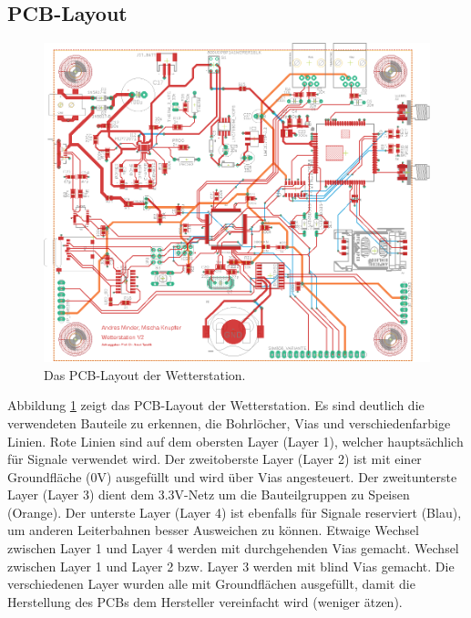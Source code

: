\begin{appendix}
\section{PCB-Layout}
\label{Anhang:PCB}
\begin{figure}[h]
\centering
\includegraphics[width=0.99\linewidth]{graphics/Anhang_Eagle/PCB.png}
\caption{Das PCB-Layout der Wetterstation.}
\label{fig:Anhang_PCBLayout}
\end{figure}
Abbildung \ref{fig:Anhang_PCBLayout} zeigt das PCB-Layout der Wetterstation. Es sind deutlich die verwendeten Bauteile zu erkennen, die Bohrlöcher, Vias und verschiedenfarbige Linien. Rote Linien sind auf dem obersten Layer (Layer 1), welcher hauptsächlich für Signale verwendet wird. Der zweitoberste Layer (Layer 2) ist mit einer Groundfläche (0V) ausgefüllt und wird über Vias angesteuert. Der zweitunterste Layer (Layer 3) dient dem 3.3V-Netz um die Bauteilgruppen zu Speisen (Orange). Der unterste Layer (Layer 4) ist ebenfalls für Signale reserviert (Blau), um anderen Leiterbahnen besser Ausweichen zu können. Etwaige Wechsel zwischen Layer 1 und Layer 4 werden mit durchgehenden Vias gemacht. Wechsel zwischen Layer 1 und Layer 2 bzw. Layer 3 werden mit blind Vias gemacht. Die verschiedenen Layer wurden alle mit Groundflächen ausgefüllt, damit die Herstellung des PCBs dem Hersteller vereinfacht wird (weniger ätzen).

\end{appendix}

